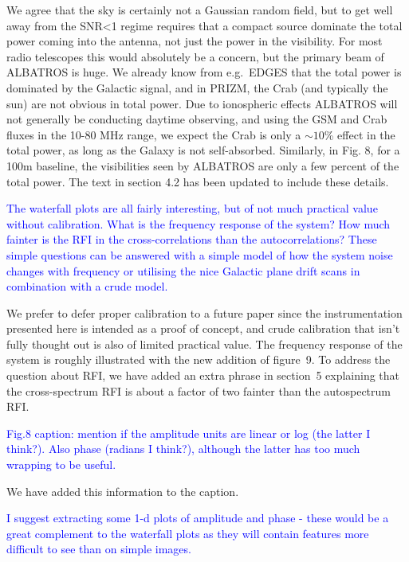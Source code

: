 \documentclass[11pt]{article}
\begin{document}
We agree that the sky is certainly not a Gaussian random field, but to
get well away from the SNR<1 regime requires that a compact source
dominate the total power coming into the antenna, not just the power
in the visibility.  For most radio telescopes this would absolutely be
a concern, but the primary beam of ALBATROS is huge.  We already know
from e.g.\ EDGES that the total power is dominated by the Galactic
signal, and in PRIZM, the Crab (and typically the sun) are not obvious
in total power.  Due to ionospheric effects ALBATROS will not
generally be conducting daytime observing, and using the GSM and Crab
fluxes in the 10-80 MHz range, we expect the Crab is only a $\sim10$\%
effect in the total power, as long as the Galaxy is not self-absorbed.
Similarly, in Fig. 8, for a 100m baseline, the visibilities seen by
ALBATROS are only a few percent of the total power.  The text in
section 4.2 has been updated to include these details.

\noindent \textcolor{blue}{The waterfall plots are all fairly
  interesting, but of not much practical value without
  calibration. What is the frequency response of the system? How much
  fainter is the RFI in the cross-correlations than the
  autocorrelations? These simple questions can be answered with a
  simple model of how the system noise changes with frequency or
  utilising the nice Galactic plane drift scans in combination with a
  crude model.}

We prefer to defer proper calibration to a future paper since the
instrumentation presented here is intended as a proof of concept, and
crude calibration that isn't fully thought out is also of limited
practical value.  The frequency response of the system is roughly
illustrated with the new addition of figure~9.  To address the
question about RFI, we have added an extra phrase in section~5
explaining that the cross-spectrum RFI is about a factor of two
fainter than the autospectrum RFI.

\noindent \textcolor{blue}{Fig.8 caption: mention if the amplitude
  units are linear or log (the latter I think?). Also phase (radians I
  think?), although the latter has too much wrapping to be useful.}

We have added this information to the caption.

\noindent \textcolor{blue}{I suggest extracting some 1-d plots of
  amplitude and phase - these would be a great complement to the
  waterfall plots as they will contain features more difficult to see
  than on simple images.}
\end{document}
